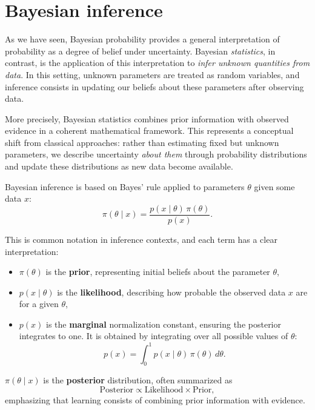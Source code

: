 \section{Bayesian inference}

As we have seen, Bayesian probability provides a general interpretation of probability as a degree of belief under uncertainty. Bayesian \emph{statistics}, in contrast, is the application of this interpretation to \textit{infer unknown quantities from data}. In this setting, unknown parameters are treated as random variables, and inference consists in updating our beliefs about these parameters after observing data.

More precisely, Bayesian statistics combines prior information with observed evidence in a coherent mathematical framework. This represents a conceptual shift from classical approaches: rather than estimating fixed but unknown parameters, we describe uncertainty \textit{about them} through probability distributions and update these distributions as new data become available.

\medskip

Bayesian inference is based on Bayes’ rule applied to parameters $\theta$ given some data $x$:
\[
    \pi(\theta \mid x)=\frac{p(x\mid \theta)\,\pi(\theta)}{p(x)}.
\]

This is common notation in inference contexts, and each term has a clear interpretation:
\begin{itemize}
    \item $\pi(\theta)$ is the \textbf{prior}, representing initial beliefs about the parameter $\theta$,
    \item $p(x \mid \theta)$ is the \textbf{likelihood}, describing how probable the observed data $x$ are for a given $\theta$,
    \item $p(x)$ is the \textbf{marginal} normalization constant, ensuring the posterior integrates to one. It is obtained by integrating over all possible values of $\theta$:
    \[
        p(x) = \int_0^1 p(x \mid \theta)\,\pi(\theta)\,d\theta.
    \]
\end{itemize}

$\pi(\theta \mid x)$ is the \textbf{posterior} distribution, often summarized as
\[
    \text{Posterior} \propto \text{Likelihood} \times \text{Prior},
\]
emphasizing that learning consists of combining prior information with evidence.

